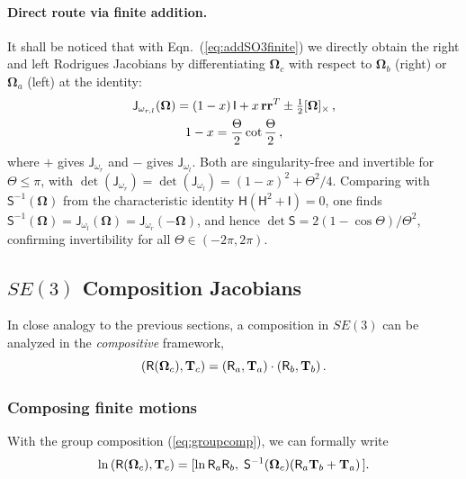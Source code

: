 \documentclass[journal]{IEEEtran}
\newcommand{\bfOmega}{\boldsymbol{\Omega}}
\newcommand{\beq}{\begin{equation}}
\newcommand{\eeq}{\end{equation}}
\begin{document}
\paragraph{Direct route via finite addition.}
It shall be noticed that with Eqn.~(\ref{eq:addSO3finite}) we directly obtain
the right and left Rodrigues Jacobians by differentiating $\bfOmega_c$ with
respect to $\bfOmega_b$ (right) or $\bfOmega_a$ (left) at the identity:
\begin{multline}
    \mathsf{J}_{\omega_{r,l}}(\bfOmega) = (1-x)\,\mathsf{I} + x\,{\bf r}{\bf r}^T
    \pm \tfrac{1}{2}[\bfOmega]_\times\,,\\
    1-x = {\Theta\over 2}\cot{\Theta\over 2}\,,
    \label{eq:RodweinormanJ}
\end{multline}
where $+$ gives $\mathsf{J}_{\omega_r}$ and $-$ gives $\mathsf{J}_{\omega_l}$.
Both are singularity-free and invertible for $\Theta\leq\pi$, with
$\det(\mathsf{J}_{\omega_r}) = \det(\mathsf{J}_{\omega_l}) = (1-x)^2 + \Theta^2/4$.
Comparing with $\mathsf{S}^{-1}(\bfOmega)$ from the characteristic identity
$\mathsf{H}(\mathsf{H}^2+\mathsf{I})=0$, one finds
$\mathsf{S}^{-1}(\bfOmega) = \mathsf{J}_{\omega_l}(\bfOmega) = \mathsf{J}_{\omega_r}(-\bfOmega)$,
and hence $\det\mathsf{S} = 2(1-\cos\Theta)/\Theta^2$, confirming invertibility
for all $\Theta\in(-2\pi,2\pi)$.

\subsection{$SE(3)$ Composition Jacobians}
\label{app:SE3composition}
In close analogy to the previous sections, a composition in $SE(3)$ can be analyzed
in the {\em compositive} framework,
\beq
    (\mathsf{R}(\bfOmega_c),{\bf T}_c)=(\mathsf{R}_a,{\bf T}_a)\cdot
    (\mathsf{R}_b,{\bf T}_b)\, .
\eeq

\subsubsection{Composing finite motions}
With the group composition (\ref{eq:groupcomp}), we can formally write
\beq
    \ln \, (\mathsf{R}(\bfOmega_c),{\bf T}_c) = [\ln \mathsf{R}_a\mathsf{R}_b,\;
    \mathsf{S}^{-1}(\bfOmega_c) (\mathsf{R}_a{\bf T}_b + {\bf T}_a) \, ].
    \label{eq:addfiniteSE3}
\eeq
\end{document}
